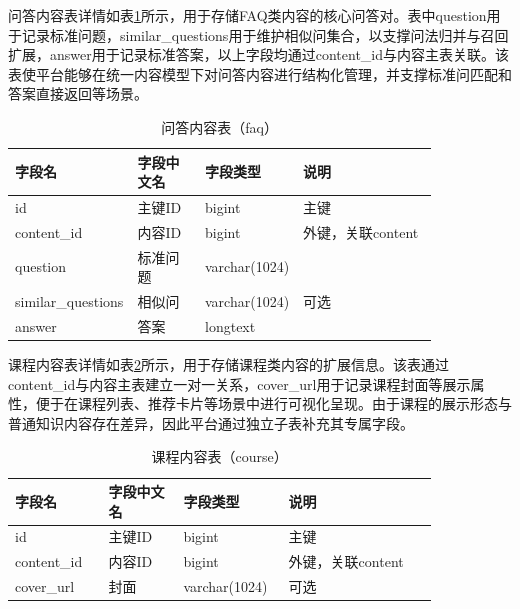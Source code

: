 问答内容表详情如表\ref{tab:db_faq}所示，用于存储FAQ类内容的核心问答对。表中question用于记录标准问题，similar\_\allowbreak questions用于维护相似问集合，以支撑问法归并与召回扩展，answer用于记录标准答案，以上字段均通过content\_\allowbreak id与内容主表关联。该表使平台能够在统一内容模型下对问答内容进行结构化管理，并支撑标准问匹配和答案直接返回等场景。

\begin{table}[!htbp]
  \centering
  \caption{问答内容表（faq）}
  \label{tab:db_faq}
  \small
  \begin{tabular}{>{\raggedright\arraybackslash}p{0.20\linewidth}|>{\raggedright\arraybackslash}p{0.16\linewidth}|>{\raggedright\arraybackslash}p{0.16\linewidth}|>{\raggedright\arraybackslash}p{0.32\linewidth}}
    \hline
    字段名 & 字段中文名 & 字段类型 & 说明 \\ \hline
    id & 主键ID & bigint & 主键 \\ \hline
    content\_id & 内容ID & bigint & 外键，关联content \\ \hline
    question & 标准问题 & varchar(1024) & \\ \hline
    similar\_questions & 相似问 & varchar(1024) & 可选 \\ \hline
    answer & 答案 & longtext & \\ \hline
  \end{tabular}
\end{table}

课程内容表详情如表\ref{tab:db_course}所示，用于存储课程类内容的扩展信息。该表通过content\_\allowbreak id与内容主表建立一对一关系，cover\_\allowbreak url用于记录课程封面等展示属性，便于在课程列表、推荐卡片等场景中进行可视化呈现。由于课程的展示形态与普通知识内容存在差异，因此平台通过独立子表补充其专属字段。

\begin{table}[!htbp]
  \centering
  \caption{课程内容表（course）}
  \label{tab:db_course}
  \small
  \begin{tabular}{>{\raggedright\arraybackslash}p{0.20\linewidth}|>{\raggedright\arraybackslash}p{0.16\linewidth}|>{\raggedright\arraybackslash}p{0.16\linewidth}|>{\raggedright\arraybackslash}p{0.32\linewidth}}
    \hline
    字段名 & 字段中文名 & 字段类型 & 说明 \\ \hline
    id & 主键ID & bigint & 主键 \\ \hline
    content\_id & 内容ID & bigint & 外键，关联content \\ \hline
    cover\_url & 封面 & varchar(1024) & 可选 \\ \hline
    
  \end{tabular}
\end{table}

